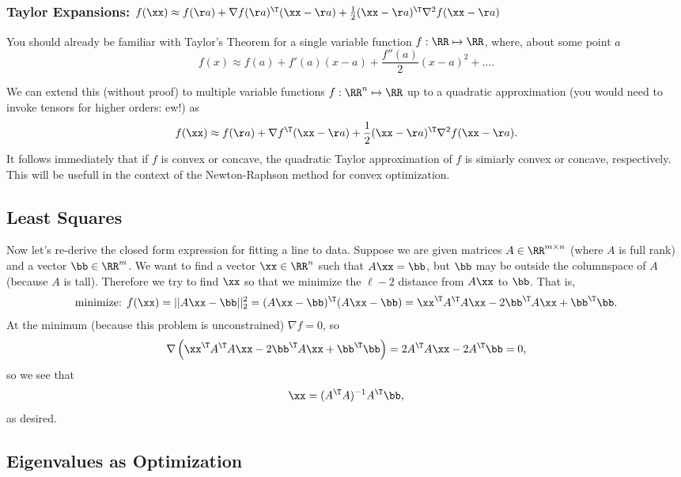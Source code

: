 \documentclass{article}
\begin{document}
\subsubsection{Taylor Expansions: $f(\xx) \approx f(\aa) + \nabla f(\aa)^\T (\xx-\aa) + \frac{1}{2}(\xx-\aa)^\T \nabla^2 f (\xx-\aa)$}

You should already be familiar with Taylor's Theorem for a single variable function
$f : \RR \mapsto \RR$, where, about some point $a$
\[
    f(x) \approx f(a) + f'(a)(x-a) + \frac{f''(a)}{2}(x-a)^2 + \dots.
\]

We can extend this (without proof) to multiple variable functions
$f : \RR^n \mapsto \RR$ up to a quadratic approximation (you would need
to invoke tensors for higher orders: ew!) as
\[
    f(\xx) \approx f(\aa) + \nabla f^\T(\xx-\aa) + \frac{1}{2}(\xx-\aa)^\T \nabla^2 f (\xx-\aa).
\]
It follows immediately that if $f$ is convex or concave, the quadratic
Taylor approximation of $f$ is simiarly convex or concave, respectively.
This will be usefull in the context of the Newton-Raphson method for
convex optimization.

\subsection{Least Squares}

Now let's re-derive the closed form expression for fitting a line
to data. Suppose we are given matrices $A\in\RR^{m\times n}$ (where
$A$ is full rank) and a vector $\bb\in\RR^m$. We want to find a vector
$\xx\in\RR^n$ such that $A\xx=\bb$, but $\bb$ may be outside the
columnspace of $A$ (because $A$ is tall). Therefore we try to find
$\xx$ so that we minimize the $\ell-2$ distance from $A\xx$ to $\bb$.
That is,
\[
    \text{minimize: } f(\xx) = ||A\xx - \bb||_2^2 = (A\xx - \bb)^\T(A\xx-\bb) = \xx^\T A^\T A\xx - 2\bb^\T A\xx + \bb^\T\bb.
\]
At the minimum (because this problem is unconstrained) $\nabla f = 0$, so
\[
    \nabla \left(\xx^\T A^\T A\xx - 2\bb^\T A\xx + \bb^\T\bb\right) = 2A^\T A\xx - 2A^\T \bb = 0,
\]
so we see that
\[
    \xx = (A^\T A)^{-1}A^\T\bb,
\]
as desired.

\subsection{Eigenvalues as Optimization}
\end{document}
